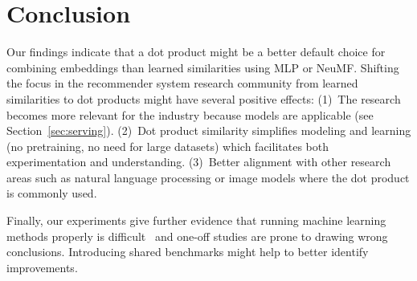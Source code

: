 \documentclass{article}
\begin{document}
\section{Conclusion}

Our findings indicate that a dot product might be a better default choice for combining embeddings than learned similarities using MLP or NeuMF.
Shifting the focus in the recommender system research community from learned similarities to dot products might have several positive effects:
(1)~The research becomes more relevant for the industry because models are applicable (see Section~\ref{sec:serving}).
(2)~Dot product similarity simplifies modeling and learning (no pretraining, no need for large datasets) which facilitates both experimentation and understanding.
(3)~Better alignment with other research areas such as natural language processing or image models where the dot product is commonly used.

Finally, our experiments give further evidence that running machine learning methods properly is difficult~\cite{rendle:arxiv19} and one-off studies are prone to drawing wrong conclusions.
Introducing shared benchmarks might help to better identify improvements.
\end{document}
